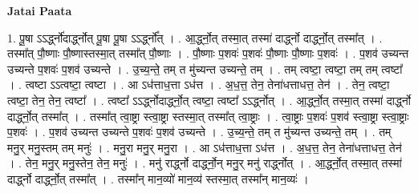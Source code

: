 \documentclass[17pt]{extarticle}
\begin{document}
\textbf{Jatai Paata} \newline

1. पू॒षा ऽऽर्द्ध्नो॑दार्द्ध्नोत् पू॒षा पू॒षा ऽऽर्द्ध्नो᳚त् । . आ॒र्द्ध्नो॒त् तस्मा॒त् तस्मा॑ दार्द्ध्नो दार्द्ध्नो॒त् तस्मा᳚त् । . तस्मा᳚त् पौ॒ष्णाः पौ॒ष्णास्तस्मा॒त् तस्मा᳚त् पौ॒ष्णाः । . पौ॒ष्णाः प॒शवः॑ प॒शवः॑ पौ॒ष्णाः पौ॒ष्णाः प॒शवः॑ । . प॒शव॑ उच्यन्त उच्यन्ते प॒शवः॑ प॒शव॑ उच्यन्ते । . उ॒च्य॒न्ते॒ तम् त मु॑च्यन्त उच्यन्ते॒ तम् । . तम् त्वष्टा॒ त्वष्टा॒ तम् तम् त्वष्टा᳚ । . त्वष्टा ऽऽत्वष्टा॒ त्वष्टा । . आ ऽध॑त्ताध॒त्ता ऽध॑त्त । . अ॒ध॒त्त॒ तेन॒ तेना॑धत्ताधत्त॒ तेन॑ । . तेन॒ त्वष्टा॒ त्वष्टा॒ तेन॒ तेन॒ त्वष्टा᳚ । . त्वष्टा᳚ ऽऽर्द्ध्नोदार्द्ध्नो॒त् त्वष्टा॒ त्वष्टा᳚ ऽऽर्द्ध्नोत् । . आ॒र्द्ध्नो॒त् तस्मा॒त् तस्मा॑ दार्द्ध्नो दार्द्ध्नो॒त् तस्मा᳚त् । . तस्मा᳚त् त्वा॒ष्ट्रा स्त्वा॒ष्ट्रा स्तस्मा॒त् तस्मा᳚त् त्वा॒ष्ट्राः । . त्वा॒ष्ट्राः प॒शवः॑ प॒शव॑ स्त्वा॒ष्ट्रा स्त्वा॒ष्ट्राः प॒शवः॑ । . प॒शव॑ उच्यन्त उच्यन्ते प॒शवः॑ प॒शव॑ उच्यन्ते । . उ॒च्य॒न्ते॒ तम् त मु॑च्यन्त उच्यन्ते॒ तम् । . तम् मनु॒र् मनु॒स्तम् तम् मनुः॑ । . मनु॒रा मनु॒र् मनु॒रा । . आ ऽध॑त्ताध॒त्ता ऽध॑त्त । . अ॒ध॒त्त॒ तेन॒ तेना॑धत्ताधत्त॒ तेन॑ । . तेन॒ मनु॒र् मनु॒स्तेन॒ तेन॒ मनुः॑ । . मनु॑ रार्द्ध्नो दार्द्ध्नो॒न् मनु॒र् मनु॑ रार्द्ध्नोत् । . आ॒र्द्ध्नो॒त् तस्मा॒त् तस्मा॑ दार्द्ध्नो दार्द्ध्नो॒त् तस्मा᳚त् । . तस्मा᳚न् मान॒व्यो॑ मान॒व्य॑ स्तस्मा॒त् तस्मा᳚न् मान॒व्यः॑ । \newline
\end{document}
